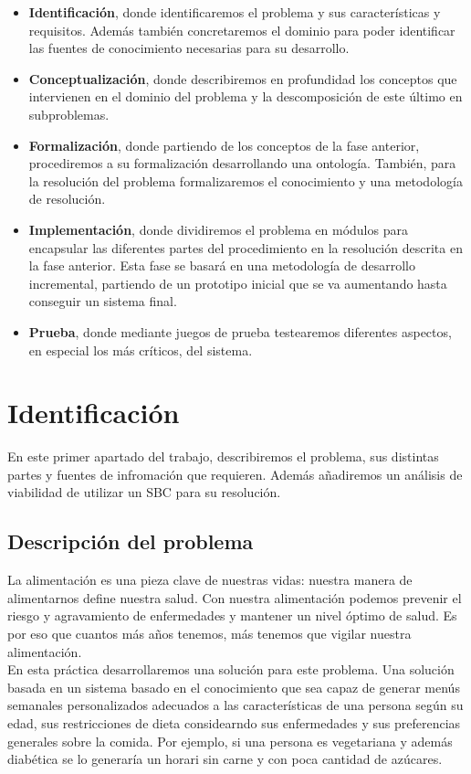 \documentclass[12]{article}
\begin{document}
\begin{itemize}
	\item \textbf{Identificación}, donde identificaremos el problema y sus características y requisitos. Además también concretaremos el dominio para poder identificar las fuentes de conocimiento necesarias para su desarrollo.%
	\item \textbf{Conceptualización}, donde describiremos en profundidad los conceptos que intervienen en el dominio del problema y la descomposición de este último en subproblemas. %
	\item \textbf{Formalización}, donde partiendo de los conceptos de la fase anterior, procediremos a su formalización desarrollando una ontología. También, para la resolución del problema formalizaremos el conocimiento y una metodología de resolución.
\item \textbf{Implementación}, donde dividiremos el problema en módulos para encapsular las diferentes partes del procedimiento en la resolución descrita en la fase anterior. Esta fase se basará en una metodología de desarrollo incremental, partiendo de un prototipo inicial que se va aumentando hasta conseguir un sistema final. 
\item \textbf{Prueba}, donde mediante juegos de prueba testearemos diferentes aspectos, en especial los más críticos, del sistema. 
\end{itemize}

\section{Identificación} %
En este primer apartado del trabajo, describiremos el problema, sus distintas partes y fuentes de infromación que requieren. Además añadiremos un análisis de viabilidad de utilizar un SBC para su resolución.

\subsection{Descripción del problema}
La alimentación es una pieza clave de nuestras vidas: nuestra manera de alimentarnos define nuestra salud. Con nuestra alimentación podemos prevenir el riesgo y agravamiento de enfermedades y mantener un nivel óptimo de salud. Es por eso que cuantos más años tenemos, más tenemos que vigilar nuestra alimentación.
\\
En esta práctica desarrollaremos una solución para este problema. Una solución basada en un sistema basado en el conocimiento que sea capaz de generar menús semanales personalizados adecuados a las características de una persona según su edad, sus restricciones de dieta considearndo sus enfermedades y sus preferencias generales sobre la comida. Por ejemplo, si una persona es vegetariana y además diabética se lo generaría un horari sin carne y con poca cantidad de azúcares. 
\end{document}
